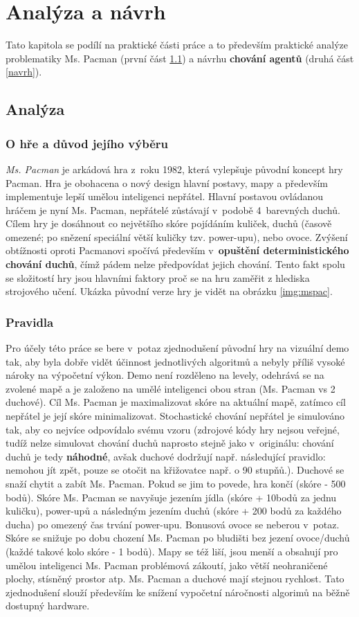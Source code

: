 \chapter{Analýza a návrh}
\label{anavrh}
Tato kapitola se podílí na praktické části práce a to především praktické analýze problematiky Ms. Pacman (první část \ref{analyza}) a návrhu \textbf{chování agentů} (druhá část \ref{navrh}).

\section{Analýza}
\label{analyza}
\subsection*{O hře a důvod jejího výběru}
\textit{Ms. Pacman} je arkádová hra z roku 1982, která vylepšuje původní koncept hry Pacman. Hra je obohacena o nový design hlavní postavy, mapy a především implementuje lepší umělou inteligenci nepřátel. Hlavní postavou ovládanou hráčem je nyní Ms. Pacman, nepřátelé zůstávají v podobě 4 barevných duchů. Cílem hry je dosáhnout co největšího skóre pojídáním kuliček, duchů (časově omezené; po snězení speciální větší kuličky tzv. power-upu), nebo ovoce.
Zvýšení obtížnosti oproti Pacmanovi spočívá především v \textbf{opuštění deterministického chování duchů}, čímž pádem nelze předpovídat jejich chování. Tento fakt spolu se složitostí hry jsou hlavními faktory proč se na hru zaměřit z hlediska strojového učení. Ukázka původní verze hry je vidět na obrázku \ref{img:mspac}.

\subsection*{Pravidla}
Pro účely této práce se bere v potaz zjednodušení původní hry na vizuální demo tak, aby byla dobře vidět účinnost jednotlivých algoritmů a nebyly příliš vysoké nároky na výpočetní výkon. Demo není rozděleno na levely, odehrává se na zvolené mapě a je založeno na umělé inteligenci obou stran (Ms. Pacman vs 2 duchové). Cíl Ms. Pacman je maximalizovat skóre na aktuální mapě, zatímco cíl nepřátel je její skóre minimalizovat. Stochastické chování nepřátel je simulováno tak, aby co nejvíce odpovídalo svému vzoru (zdrojové kódy hry nejsou veřejné, tudíž nelze simulovat chování duchů naprosto stejně jako v originálu: chování duchů je tedy \textbf{náhodné}, avšak duchové dodržují např. následující pravidlo: nemohou jít zpět, pouze se otočit na křižovatce např. o 90 stupňů.). Duchové se snaží chytit a zabít Ms. Pacman. Pokud se jim to povede, hra končí (skóre - 500 bodů). Skóre Ms. Pacman se navyšuje jezením jídla (skóre + 10bodů za jednu kuličku), power-upů a následným jezením duchů (skóre + 200 bodů za každého ducha) po omezený čas trvání power-upu. Bonusová ovoce se neberou v potaz. Skóre se snižuje po dobu chození Ms. Pacman po bludišti bez jezení ovoce/duchů (každé takové kolo skóre - 1 bodů). Mapy se též liší, jsou menší a obsahují pro umělou inteligenci Ms. Pacman problémová zákoutí, jako větší neohraničené plochy, stísněný prostor atp. Ms. Pacman a duchové mají stejnou rychlost. Tato zjednodušení slouží především ke snížení vypočetní náročnosti algorimů na běžně dostupný hardware.

